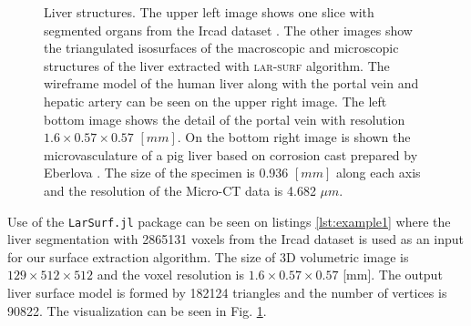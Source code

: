 \begin{figure}
\caption{
Liver structures. The upper left image shows one slice  with segmented organs from  the Ircad dataset \cite{ircadb}.
The other images show the triangulated isosurfaces of the macroscopic and microscopic structures of the liver extracted with \textsc{lar-surf} algorithm. 
The wireframe model of the human liver along with the portal vein and hepatic artery can be seen on the upper right image. 
The left bottom image shows the detail of the portal vein  
with resolution $1.6\times0.57\times0.57$ $[mm]$.
On the bottom right image is shown the microvasculature of a pig liver based on corrosion cast prepared by Eberlova
\cite{eberlova2017use}. The size of the specimen is 0.936 $[mm]$ along each axis and the resolution of the Micro-CT data is 4.682 $\mu{}m$.
} \label{fig:example_liver_macro_micro}
\end{figure}


Use of the \texttt{LarSurf.jl} package can be seen on listings \ref{lst:example1} where the liver segmentation with 2865131 voxels from the
Ircad dataset is used as an input for our surface extraction algorithm. The size of 3D volumetric 
image is $129 \times 512 \times 512$
and the voxel resolution is $1.6\times0.57\times0.57$ [mm]. 
The output liver surface model is formed by  182124 triangles and the number of vertices is 90822. 
The visualization can 
be seen in Fig. \ref{fig:example_liver_macro_micro}. 



